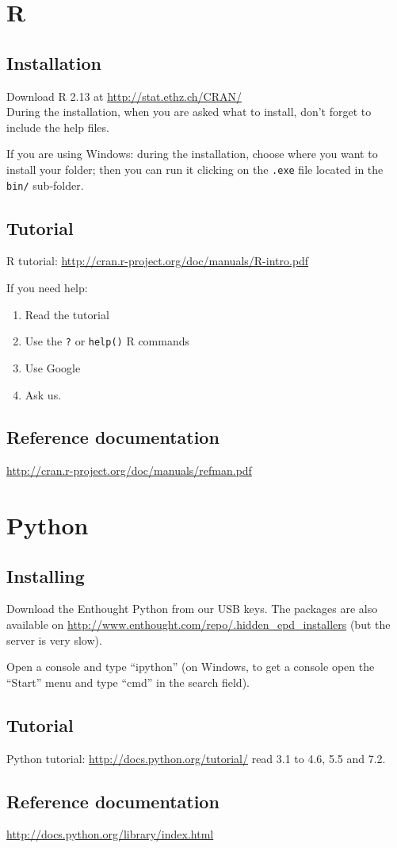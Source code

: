 \documentclass[a4paper,11pt]{article}
\begin{document}
\clearpage
\section{R}
\subsection{Installation}
Download R 2.13 at \url{http://stat.ethz.ch/CRAN/}\\
During the installation, when you are asked what to install, don't forget to include the help files.

If you are using Windows: during the installation, choose where you want to install your folder; then you can run it clicking on the \texttt{.exe} file located in the \texttt{bin/} sub-folder.

\subsection{Tutorial}
R tutorial: \url{http://cran.r-project.org/doc/manuals/R-intro.pdf}

If you need help:
\begin{enumerate}
\item Read the tutorial
\item Use the \texttt{?} or \texttt{help()} R commands
\item Use Google
\item Ask us.
\end{enumerate}

\subsection{Reference documentation}
\url{http://cran.r-project.org/doc/manuals/refman.pdf}

\section{Python}

\subsection{Installing}
Download the Enthought Python from our USB keys. The packages are also available on \url{http://www.enthought.com/repo/.hidden\_epd\_installers} (but the server is very slow).

Open a console and type ``ipython''
(on Windows, to get a console open the ``Start'' menu and type ``cmd'' in the search field).

\subsection{Tutorial}
Python tutorial: \url{http://docs.python.org/tutorial/} read 3.1 to 4.6, 5.5 and 7.2.

\subsection{Reference documentation}
\url{http://docs.python.org/library/index.html}
\end{document}
